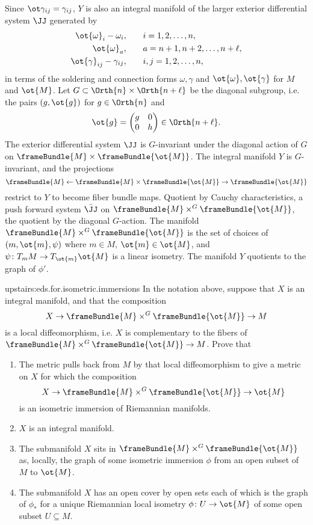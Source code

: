 Since \(\ot\gamma_{ij}=\gamma_{ij}\), \(Y\) is also an integral manifold of the larger exterior differential system \(\JJ\) generated by
\begin{align*}
\ot{\omega}_i-\omega_i,&\qquad i=1,2,\dots,n, \\
\ot{\omega}_a,&\qquad a=n+1,n+2,\dots,n+\ell,\\
\ot{\gamma}_{ij}-\gamma_{ij},&\qquad i,j=1,2,\dots,n,
\end{align*}
in terms of the soldering and connection forms \(\omega,\gamma\) and \(\ot{\omega},\ot{\gamma}\) for \(M\) and \(\ot{M}\).
Let \(G\subset \Orth{n} \times \Orth{n+\ell}\) be the diagonal subgroup, i.e. the pairs \((g,\ot{g})\) for \(g \in \Orth{n}\) and 
\[
\ot{g}=
\begin{pmatrix}
g&0\\
0&h
\end{pmatrix}\in\Orth{n+\ell}.
\]
The exterior differential system \(\JJ\) is \(G\)-invariant under the diagonal action of \(G\) on \(\frameBundle{M} \times \frameBundle{\ot{M}}\).
The integral manifold \(Y\) is \(G\)-invariant, and the projections 
\[
\frameBundle{M} \gets \frameBundle{M} \times \frameBundle{\ot{M}} \to \frameBundle{\ot{M}}
\]
restrict to \(Y\) to become fiber bundle maps.
Quotient by Cauchy characteristics, a push forward system \(\bar\JJ\) on \(\frameBundle{M} \times^G \frameBundle{\ot{M}}\), the quotient by the diagonal \(G\)-action.
The manifold \(\frameBundle{M} \times^G \frameBundle{\ot{M}}\) is the set of choices of \((m,\ot{m},\psi)\) where \(m \in M\), \(\ot{m}\in \ot{M}\), and \(\psi\colon T_m M \to T_{\ot{m}} \ot{M}\) is a linear isometry.
The manifold \(Y\) quotients to the graph of \(\phi'\).
\begin{problem}{upstairs:eds.for.isometric.immersions}
In the notation above, suppose that \(X\) is an integral manifold, and that the composition 
\[
X \to \frameBundle{M} \times^G \frameBundle{\ot{M}}\to M
\]
is a local diffeomorphism, i.e. \(X\) is complementary to the fibers of \(\frameBundle{M} \times^G \frameBundle{\ot{M}}\to M\).
Prove that 
\begin{enumerate}
\item
The metric pulls back from \(M\) by that local diffeomorphism to give a metric on \(X\) for which the composition
\[
X \to \frameBundle{M} \times^G \frameBundle{\ot{M}}\to \ot{M}
\]
is an isometric immersion of Riemannian manifolds.
\item
\(X\) is an integral manifold.
\item
The submanifold \(X\) sits in \(\frameBundle{M} \times^G \frameBundle{\ot{M}}\) as, locally, the graph of some isometric immersion \(\phi\) from an open subset of \(M\) to \(\ot{M}\).
\item
The submanifold \(X\) has an open cover by open sets each of which is the graph of \(\phi_*\) for a unique Riemannian local isometry \(\phi \colon U \to \ot{M}\) of some open subset \(U\subseteq M\).
\end{enumerate}
\end{problem}
